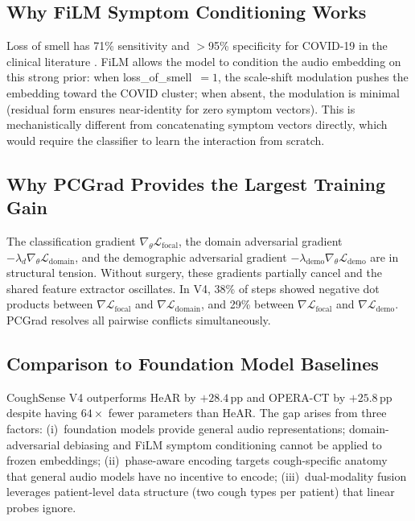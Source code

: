 \documentclass[journal]{IEEEtran}
\newcommand{\Lc}{\mathcal{L}}
\begin{document}
\subsection{Why FiLM Symptom Conditioning Works}

Loss of smell has 71\% sensitivity and $>$95\% specificity for
COVID-19 in the clinical literature \cite{sympnet2022}. FiLM allows
the model to condition the audio embedding on this strong prior:
when loss\_of\_smell~$= 1$, the scale-shift modulation pushes the
embedding toward the COVID cluster; when absent, the modulation is
minimal (residual form ensures near-identity for zero symptom vectors).
This is mechanistically different from concatenating symptom vectors
directly, which would require the classifier to learn the interaction
from scratch.

\subsection{Why PCGrad Provides the Largest Training Gain}

The classification gradient $\nabla_\theta\Lc_\text{focal}$,
the domain adversarial gradient $-\lambda_d\nabla_\theta\Lc_\text{domain}$,
and the demographic adversarial gradient
$-\lambda_\text{demo}\nabla_\theta\Lc_\text{demo}$
are in structural tension. Without surgery, these gradients partially
cancel and the shared feature extractor oscillates. In V4, 38\% of
steps showed negative dot products between
$\nabla\Lc_\text{focal}$ and $\nabla\Lc_\text{domain}$, and 29\%
between $\nabla\Lc_\text{focal}$ and $\nabla\Lc_\text{demo}$.
PCGrad resolves all pairwise conflicts simultaneously.

\subsection{Comparison to Foundation Model Baselines}

CoughSense V4 outperforms HeAR \cite{hear2024} by $+28.4$\,pp and
OPERA-CT \cite{opera2023} by $+25.8$\,pp despite having
$64\times$ fewer parameters than HeAR. The gap arises from three
factors: (i)~foundation models provide general audio representations;
domain-adversarial debiasing and FiLM symptom conditioning cannot be
applied to frozen embeddings; (ii)~phase-aware encoding targets
cough-specific anatomy that general audio models have no incentive
to encode; (iii)~dual-modality fusion leverages patient-level data
structure (two cough types per patient) that linear probes ignore.
\end{document}
